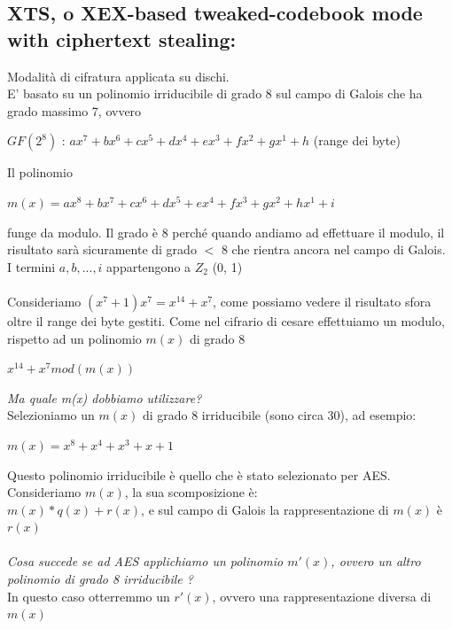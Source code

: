 \documentclass[11pt, oneside]{article}   	%
\begin{document}
\subsection*{XTS, o XEX-based tweaked-codebook mode with ciphertext stealing:}
Modalità di cifratura applicata su dischi. \\
E' basato su un polinomio irriducibile di grado 8 sul campo di Galois che ha grado massimo 7, ovvero\begin{center}
 $GF(2^8)$ : $ax^7+bx^6+cx^5+dx^4+ex^3+fx^2+gx^1+ h$ (range dei byte)
 \end{center}
Il polinomio \begin{center}$m(x) = ax^8+bx^7+cx^6+dx^5+ex^4+fx^3+gx^2+ hx^1 + i$ \end{center}funge da modulo. Il grado è 8 perché quando andiamo ad effettuare il modulo, il risultato sarà sicuramente di grado $<$ $8$ che rientra ancora nel campo di Galois.\\ I termini $a,b,...,i$ appartengono a $Z_2$ (0, 1)\\\\
Consideriamo $(x^7+1)x^7 = x^{14} + x^7$, come possiamo vedere il risultato sfora oltre il range dei byte gestiti.
Come nel cifrario di cesare effettuiamo un modulo, rispetto ad un polinomio $m(x)$ di grado 8
\begin{center}
$x^{14} + x^7 mod(m(x))$
\end{center}
\emph{Ma quale m(x) dobbiamo utilizzare?} \\Selezioniamo un $m(x)$ di grado 8 irriducibile (sono circa 30), ad esempio: \begin{center}
$m(x) = x^8 + x^4 + x^3 +x+1$
\end{center}
Questo polinomio irriducibile è quello che è stato selezionato per AES.\\
Consideriamo $m(x)$, la sua scomposizione è: \\$m(x) * q(x) + r(x)$, e sul campo di Galois la rappresentazione di $m(x)$ è $r(x)$ \\\\
\emph{Cosa succede se ad AES applichiamo un polinomio $m'(x)$, ovvero un altro polinomio di grado 8 irriducibile ?}\\
In questo caso otterremmo un $r'(x)$, ovvero una rappresentazione diversa di $m(x)$
 
\end{document}
